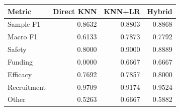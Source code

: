 \begin{tabular}{lrrr}
\toprule
Metric & Direct KNN & KNN+LR & Hybrid \\
\midrule
Sample F1 & 0.8632 & 0.8803 & 0.8868 \\
Macro F1 & 0.6133 & 0.7873 & 0.7792 \\
Safety & 0.8000 & 0.9000 & 0.8889 \\
Funding & 0.0000 & 0.6667 & 0.6667 \\
Efficacy & 0.7692 & 0.7857 & 0.8000 \\
Recruitment & 0.9709 & 0.9174 & 0.9524 \\
Other & 0.5263 & 0.6667 & 0.5882 \\
\bottomrule
\end{tabular}
